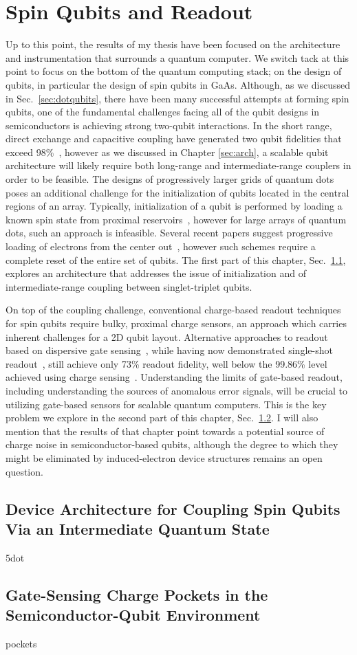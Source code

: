 \chapter{Spin Qubits and Readout}
\label{sec:spinqubit}

Up to this point, the results of my thesis have been focused on the architecture and instrumentation that surrounds a quantum
computer. We switch tack at this point to focus on the bottom of the quantum computing stack; on the design of qubits, in
particular the design of spin qubits in GaAs. Although, as we discussed in Sec.~\ref{sec:dotqubits}, there have been many
successful attempts at forming spin qubits, one of the fundamental challenges facing all of the qubit designs in semiconductors
is achieving strong two-qubit interactions. In the short range, direct exchange and capacitive coupling have generated two qubit
fidelities that exceed 98\%~\cite{PhysRevA.99.042310}, however as we discussed in Chapter \ref{sec:arch}, a scalable qubit architecture
will likely require both long-range and intermediate-range couplers in order to be feasible. The designs of progressively
larger grids of quantum dots poses an additional challenge for the initialization of qubits located in the central regions
of an array. Typically, initialization of a qubit is performed by loading a known spin state from proximal reservoirs~\cite{petta}, however
for large arrays of quantum dots, such an approach is infeasible. Several recent papers suggest progressive loading of electrons
from the center out~\cite{PhysRevApplied.6.054013,qubyte}, however such schemes require a complete reset of the entire set of qubits.
The first part of this chapter, Sec.~\ref{sec:5dot}, explores an architecture that addresses the issue of initialization and of
intermediate-range coupling between singlet-triplet qubits.

On top of the coupling challenge, conventional charge-based readout techniques for spin qubits require bulky, proximal charge sensors, an
approach which carries inherent challenges for a 2D qubit layout. Alternative approaches to readout based on dispersive gate
sensing~\cite{PhysRevLett.110.046805}, while having now demonstrated single-shot readout~\cite{Nnano_dzurak}, still achieve only 73\% readout
fidelity, well below the 99.86\% level achieved using charge sensing~\cite{Keith_2019,PhysRevX.8.021046}. Understanding the limits of gate-based
readout, including understanding the sources of anomalous error signals, will be crucial to utilizing gate-based sensors for scalable quantum
computers. This is the key problem we explore in the second part of this chapter, Sec.~\ref{sec:pockets}. I will also mention that the results
of that chapter point towards a potential source of charge noise in semiconductor-based qubits, although the degree to which they might
be eliminated by induced-electron device structures remains an open question.

\clearpage
\section{Device Architecture for Coupling Spin Qubits Via an Intermediate Quantum State}
\label{sec:5dot}
{5dot}

\clearpage
\section{Gate-Sensing Charge Pockets in the Semiconductor-Qubit Environment}
\label{sec:pockets}
{pockets}